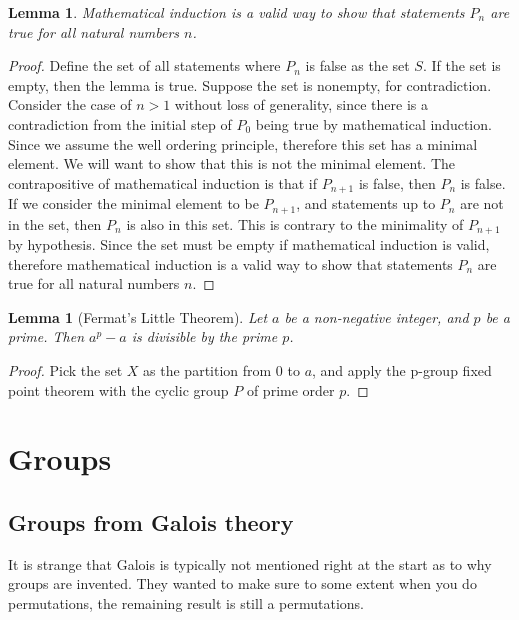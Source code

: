 \documentclass{tufte-book}
\newtheorem{lemma}[theorem]{Lemma}
\begin{document}
\begin{lemma}
  Mathematical induction is a valid way to show that statements $P_n$ are true for all natural numbers $n$.
\end{lemma}

\begin{proof}
  Define the set of all statements where $P_n$ is false as the set $S$. If the set is empty, then the lemma is true.
  Suppose the set is nonempty, for contradiction.
  Consider the case of $n > 1$ without loss of generality, since there is a contradiction from the initial step of $P_0$ being true 
  by mathematical induction.
  Since we assume the well ordering principle, therefore this set has a minimal element.
  We will want to show that this is not the minimal element.
  The contrapositive of mathematical induction is that if $P_{n+1}$ is false, then $P_{n}$ is false.
  If we consider the minimal element to be $P_{n+1}$, and statements up to $P_{n}$ are not in the set, then $P_{n}$ is also in this set.
  This is contrary to the minimality of $P_{n+1}$ by hypothesis.
  Since the set must be empty if mathematical induction is valid, therefore mathematical induction is a valid way to show that statements $P_n$ are true for all natural numbers $n$.
\end{proof}

\begin{lemma}[Fermat's Little Theorem]
  Let $a$ be a non-negative integer, and $p$ be a prime.
  Then $a^p - a$ is divisible by the prime $p$. 
\end{lemma}

\begin{proof}
  Pick the set $X$ as the partition from $0$ to $a$, and apply the p-group fixed point theorem with the cyclic group $P$ of prime order $p$.
\end{proof}

\chapter{Groups}
\label{ch:group}

\section{Groups from Galois theory}\label{sec:groupsgalois}

It is strange that Galois is typically not mentioned right at the start as to why groups are invented. They wanted to make sure to some extent when you do permutations, the remaining result is still a permutations.
\end{document}
